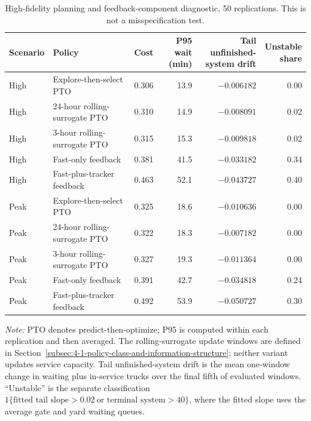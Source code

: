 \documentclass[preprint,12pt,authoryear,a4paper]{elsarticle}
\begin{document}
\begin{table}[htbp]
\centering
\caption{High-fidelity planning and feedback-component diagnostic, 50 replications. This is not a misspecification test.}
\label{tab:feedback-component-diagnostic}
\scriptsize
\setlength{\tabcolsep}{2pt}
\begin{tabular*}{\textwidth}{@{\extracolsep{\fill}}llrrrr@{}}
\toprule
Scenario & Policy & Cost & \makecell[r]{P95 wait\\(min)} & \makecell[r]{Tail unfinished-\\system drift} & \makecell[r]{Unstable\\share} \\
\midrule
High & Explore-then-select PTO & 0.306 & 13.9 & $-0.006182$ & 0.00 \\
High & 24-hour rolling-surrogate PTO & 0.310 & 14.9 & $-0.008091$ & 0.02 \\
High & 3-hour rolling-surrogate PTO & 0.315 & 15.3 & $-0.009818$ & 0.02 \\
High & Fast-only feedback & 0.381 & 41.5 & $-0.033182$ & 0.34 \\
High & Fast-plus-tracker feedback & 0.463 & 52.1 & $-0.043727$ & 0.40 \\
\midrule
Peak & Explore-then-select PTO & 0.325 & 18.6 & $-0.010636$ & 0.00 \\
Peak & 24-hour rolling-surrogate PTO & 0.322 & 18.3 & $-0.007182$ & 0.00 \\
Peak & 3-hour rolling-surrogate PTO & 0.327 & 19.3 & $-0.011364$ & 0.00 \\
Peak & Fast-only feedback & 0.391 & 42.7 & $-0.034818$ & 0.24 \\
Peak & Fast-plus-tracker feedback & 0.492 & 53.9 & $-0.050727$ & 0.30 \\
\bottomrule
\end{tabular*}
\begin{minipage}{\textwidth}
\footnotesize\raggedright
\textit{Note:} PTO denotes predict-then-optimize; P95 is computed within each replication and then averaged. The rolling-surrogate update windows are defined in Section~\ref{subsec:4-1-policy-class-and-information-structure}; neither variant updates service capacity. Tail unfinished-system drift is the mean one-window change in waiting plus in-service trucks over the final fifth of evaluated windows. ``Unstable'' is the separate classification \(1\{\text{fitted tail slope}>0.02\ \text{or terminal system}>40\}\), where the fitted slope uses the average gate and yard waiting queues.
\end{minipage}
\end{table}
\end{document}
